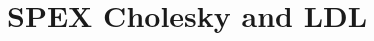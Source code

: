 \documentclass[12pt,oneside]{book}
\theoremstyle{definition}
\begin{document}

\chapter{SPEX Cholesky and LDL}\vspace{-0.75in} \label{ch:Chol}
\end{document}
